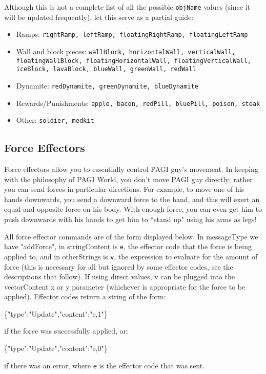 Although this is not a complete list of all the possible \texttt{objName} values (since it will be updated frequently), let this serve as a partial guide:

\begin{itemize}
\item Ramps: \texttt{rightRamp, leftRamp, floatingRightRamp, floatingLeftRamp}
\item Wall and block pieces: \texttt{wallBlock, horizontalWall, verticalWall, floatingWallBlock, floatingHorizontalWall, floatingVerticalWall, iceBlock, lavaBlock, blueWall, greenWall, redWall}
\item Dynamite: \texttt{redDynamite, greenDynamite, blueDynamite}
\item Rewards/Punishments: \texttt{apple, bacon, redPill, bluePill, poison, steak}
\item Other: \texttt{soldier, medkit}
\end{itemize}


\subsection{Force Effectors}

Force effectors allow you to essentially control PAGI guy's movement. In keeping with the philosophy of PAGI World, you don't move PAGI guy directly; rather you can send forces in particular directions. For example, to move one of his hands downwards, you send a downward force to the hand, and this will exert an equal and opposite force on his body. With enough force, you can even get him to push downwards with his hands to get him to ``stand up" using his arms as legs!

All force effector commands are of the form displayed below. In messageType we have "addForce", in stringContent is \texttt{e}, the effector code that the force is being applied to, and in otherStrings is \texttt{v}, the expression to evaluate for the amount of force (this is necessary for all but ignored by some effector codes, see the descriptions that follow). If using direct values, v can be plugged into the vectorContent x or y parameter (whichever is appropriate for the force to be applied). Effector codes return a string of the form: \begin{center}\scriptsize{\{"type":"Update","content":"e,1"\}}\end{center} 
if the force was successfully applied, or:
\begin{center}\scriptsize{\{"type":"Update","content":"e,0"\}}\end{center}
  if there was an error, where \texttt{e} is the effector code that was sent.

